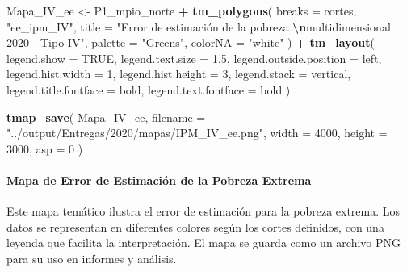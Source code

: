 \documentclass[
  12pt,
]{book}
\newenvironment{Shaded}{\begin{snugshade}}{\end{snugshade}}
\newcommand{\AttributeTok}[1]{\textcolor[rgb]{0.13,0.29,0.53}{#1}}
\newcommand{\ConstantTok}[1]{\textcolor[rgb]{0.56,0.35,0.01}{#1}}
\newcommand{\DecValTok}[1]{\textcolor[rgb]{0.00,0.00,0.81}{#1}}
\newcommand{\FloatTok}[1]{\textcolor[rgb]{0.00,0.00,0.81}{#1}}
\newcommand{\FunctionTok}[1]{\textcolor[rgb]{0.13,0.29,0.53}{\textbf{#1}}}
\newcommand{\NormalTok}[1]{#1}
\newcommand{\OtherTok}[1]{\textcolor[rgb]{0.56,0.35,0.01}{#1}}
\newcommand{\SpecialCharTok}[1]{\textcolor[rgb]{0.81,0.36,0.00}{\textbf{#1}}}
\newcommand{\StringTok}[1]{\textcolor[rgb]{0.31,0.60,0.02}{#1}}
\begin{document}
\begin{Shaded}
\begin{Highlighting}[]
\NormalTok{Mapa\_IV\_ee }\OtherTok{\textless{}{-}}
\NormalTok{  P1\_mpio\_norte }\SpecialCharTok{+} \FunctionTok{tm\_polygons}\NormalTok{(}
    \AttributeTok{breaks =}\NormalTok{ cortes,}
    \StringTok{"ee\_ipm\_IV"}\NormalTok{,}
    \AttributeTok{title =} \StringTok{"Error de estimación de la pobreza }\SpecialCharTok{\textbackslash{}n}\StringTok{multidimensional 2020 {-} Tipo IV"}\NormalTok{,}
    \AttributeTok{palette =} \StringTok{"Greens"}\NormalTok{,}
    \AttributeTok{colorNA =} \StringTok{"white"}
\NormalTok{  ) }\SpecialCharTok{+} \FunctionTok{tm\_layout}\NormalTok{(}
    \AttributeTok{legend.show =} \ConstantTok{TRUE}\NormalTok{,}
    \AttributeTok{legend.text.size =} \FloatTok{1.5}\NormalTok{,}
    \AttributeTok{legend.outside.position =} \StringTok{\textquotesingle{}left\textquotesingle{}}\NormalTok{,}
    \AttributeTok{legend.hist.width =} \DecValTok{1}\NormalTok{,}
    \AttributeTok{legend.hist.height =} \DecValTok{3}\NormalTok{,}
    \AttributeTok{legend.stack =} \StringTok{\textquotesingle{}vertical\textquotesingle{}}\NormalTok{,}
    \AttributeTok{legend.title.fontface =} \StringTok{\textquotesingle{}bold\textquotesingle{}}\NormalTok{,}
    \AttributeTok{legend.text.fontface =} \StringTok{\textquotesingle{}bold\textquotesingle{}}
\NormalTok{  )}

\FunctionTok{tmap\_save}\NormalTok{(}
\NormalTok{  Mapa\_IV\_ee,}
  \AttributeTok{filename =} \StringTok{"../output/Entregas/2020/mapas/IPM\_IV\_ee.png"}\NormalTok{,}
  \AttributeTok{width =} \DecValTok{4000}\NormalTok{,}
  \AttributeTok{height =} \DecValTok{3000}\NormalTok{,}
  \AttributeTok{asp =} \DecValTok{0}
\NormalTok{)}
\end{Highlighting}
\end{Shaded}

\hypertarget{mapa-de-error-de-estimaciuxf3n-de-la-pobreza-extrema}{%
\paragraph*{Mapa de Error de Estimación de la Pobreza Extrema}\label{mapa-de-error-de-estimaciuxf3n-de-la-pobreza-extrema}}

Este mapa temático ilustra el error de estimación para la pobreza extrema. Los datos se representan en diferentes colores según los cortes definidos, con una leyenda que facilita la interpretación. El mapa se guarda como un archivo PNG para su uso en informes y análisis.
\end{document}
